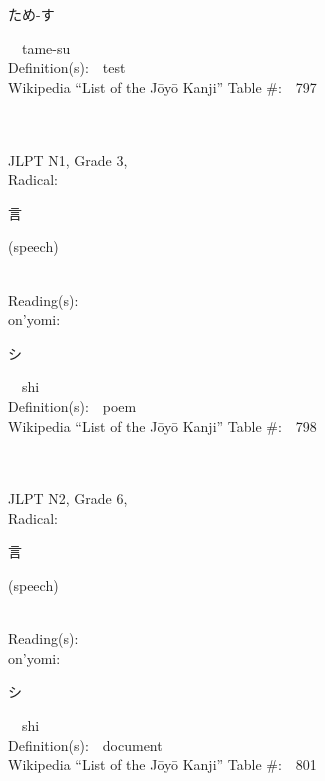 \begin{multicols}{2}
{\hspace*{2em}}{\begin{CJK}{UTF8}{min} ため-す \end{CJK}}\ \ tame-su\ \ \\
Definition(s):\ \ test \\
Wikipedia ``List of the J\=oy\=o Kanji'' Table \#:\ \ 797 \\
\ \ \\
{\fontsize{34pt}{40pt}  }\ \ \\  %
{JLPT N1, Grade 3, \\Radical:\ \ {\begin{CJK}{UTF8}{min} 言 \end{CJK}} (speech) } \\
Reading(s):\ \ \\
{\hspace*{1em}}on'yomi:\ \ \\
{\hspace*{2em}}{\begin{CJK}{UTF8}{min} シ \end{CJK}}\ \ shi\ \ \\
Definition(s):\ \ poem \\
Wikipedia ``List of the J\=oy\=o Kanji'' Table \#:\ \ 798 \\
\ \ \\
{\fontsize{34pt}{40pt}  }\ \ \\  %
{JLPT N2, Grade 6, \\Radical:\ \ {\begin{CJK}{UTF8}{min} 言 \end{CJK}} (speech) } \\
Reading(s):\ \ \\
{\hspace*{1em}}on'yomi:\ \ \\
{\hspace*{2em}}{\begin{CJK}{UTF8}{min} シ \end{CJK}}\ \ shi\ \ \\
Definition(s):\ \ document \\
Wikipedia ``List of the J\=oy\=o Kanji'' Table \#:\ \ 801 \\

\end{multicols}
